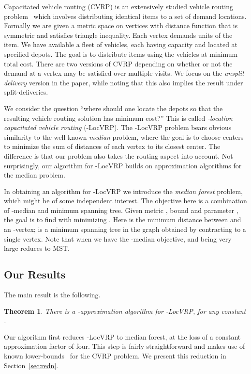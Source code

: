 \documentclass[11pt,twoside,a4paper]{article}
\newtheorem{theorem}{Theorem}
\def\lrp{-LocVRP\xspace}
\begin{document}
Capacitated vehicle routing (CVRP) is an extensively studied vehicle routing problem~\cite{TV02} which involves
distributing identical items to a set of demand locations. Formally we are given a metric space  on vertices 
with distance function  that is symmetric and satisfies triangle inequality. Each
vertex  demands  units of the item. We have available a fleet of  vehicles, each having capacity 
and located at specified depots. The goal is to distribute items using the  vehicles at minimum total cost. There
are two versions of CVRP depending on whether or not the demand at a vertex may be satisfied over multiple visits. We
focus on the  {\em unsplit delivery} version in the paper, while noting that this also implies the result under
split-deliveries.


We consider the question ``where should one locate the  depots so that the resulting vehicle routing solution has
minimum cost?'' This is called {\em -location capacitated vehicle routing} (\lrp). The \lrp problem bears obvious
similarity to the well-known {\em  median} problem, where the goal is to choose  centers to minimize the sum of
distances of each vertex to its closest center. The difference is that our problem also takes the routing aspect into
account.  Not surprisingly, our algorithm for \lrp builds on approximation algorithms for the  median problem.

In obtaining an algorithm for \lrp we introduce the {\em   median forest} problem, which might be of some
independent interest. The objective here is a combination of -median and minimum spanning tree. Given metric
, bound  and parameter , the goal is to find  with  minimizing
.  Here  is the
minimum distance between  and an -vertex;  is a minimum spanning tree in the graph obtained by
contracting  to a single vertex. Note that when  we have the -median objective, and  being very
large reduces to MST.
\subsection{Our Results}
The main result is the following.
\begin{theorem}\label{th:lcvrp}
There is a -approximation algorithm for \lrp, for any constant .
\end{theorem}
Our algorithm first reduces \lrp to  median forest, at the loss of a constant approximation factor of four. This
step is fairly straightforward and makes use of
known lower-bounds~\cite{HK85} for the CVRP problem. We present this reduction in Section~\ref{sec:redn}.
\end{document}
